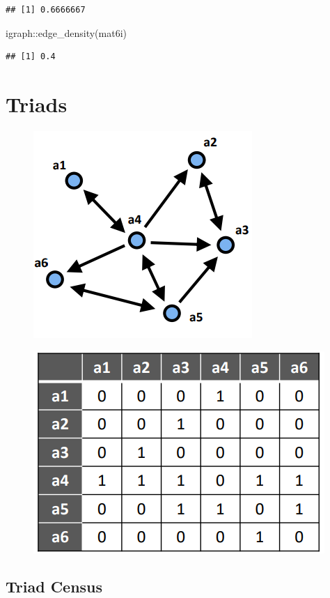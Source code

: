 \documentclass[
  notitlepage,
  onecolumn,
  openany]{book}
\newenvironment{Shaded}{\begin{snugshade}}{\end{snugshade}}
\newcommand{\FunctionTok}[1]{\textcolor[rgb]{0.00,0.00,0.00}{#1}}
\newcommand{\NormalTok}[1]{#1}
\newcommand{\SpecialCharTok}[1]{\textcolor[rgb]{0.00,0.00,0.00}{#1}}
\begin{document}
\begin{verbatim}
## [1] 0.6666667
\end{verbatim}

\begin{Shaded}
\begin{Highlighting}[]
\NormalTok{igraph}\SpecialCharTok{::}\FunctionTok{edge\_density}\NormalTok{(mat6i)}
\end{Highlighting}
\end{Shaded}

\begin{verbatim}
## [1] 0.4
\end{verbatim}

\hypertarget{triads}{%
\section{Triads}\label{triads}}

\begin{figure}[h!]

{\centering \includegraphics[width=0.3\linewidth]{images/12-Reciprocity and transitivity/Untitled 1} 

}

\end{figure}

\begin{figure}[h!]

{\centering \includegraphics[width=0.35\linewidth]{images/12-Reciprocity and transitivity/Untitled 2} 

}

\end{figure}

\hypertarget{triad-census}{%
\subsection{Triad Census}\label{triad-census}}
\end{document}
